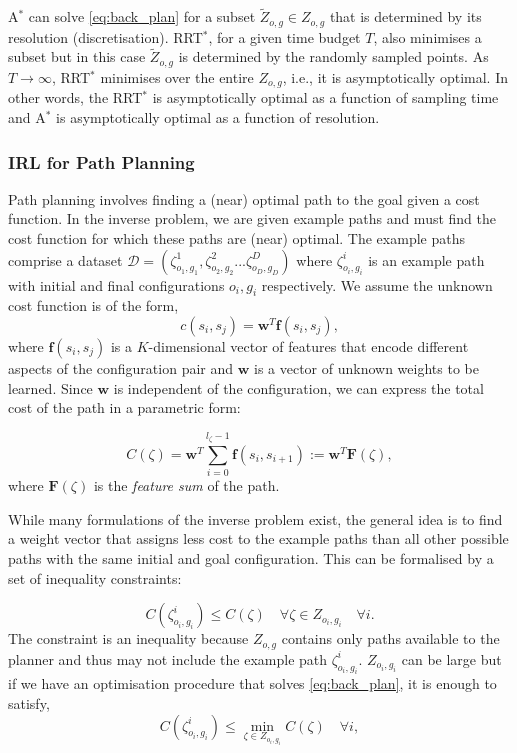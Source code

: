 \documentclass[a4paper,11pt]{report}
\begin{document}
A$^*$ can solve \eqref{eq:back_plan} for a subset $\tilde{Z}_{o,g} \in  Z_{o,g}$ that is determined by its resolution (discretisation). RRT$^*$, for a given time budget $T$, also minimises a subset but in this case $\tilde{Z}_{o,g}$ is determined by the randomly sampled points. As $T \rightarrow \infty$, RRT$^*$ minimises over the entire $Z_{o,g}$, i.e., it is asymptotically optimal. In other words, the RRT$^*$ is asymptotically optimal as a function of sampling time and A$^*$ is asymptotically optimal as a function of resolution. %

\subsubsection{IRL for Path Planning \label{subsec:inverse_problem}}
Path planning involves finding a (near) optimal path to the goal given a cost function. In the inverse problem, we are given example paths and must find the cost function for which these paths are (near) optimal.  The example paths comprise a dataset $\mathcal{D} = (\zeta^1_{o_1,g_1},\zeta^2_{o_2,g_2}...\zeta^D_{o_D,g_D})$ where $\zeta^i_{o_i,g_i}$ is an example path with initial and final configurations $o_i,g_i$ respectively. We assume the unknown cost function is of the form,
\begin{equation}
	c(s_i,s_j) = \mathbf{w}^T \mathbf{f}(s_i,s_j), \label{eq:inner_prod}
\end{equation}
where $\mathbf{f}(s_i,s_j)$ is a $K$-dimensional vector of features that encode different aspects of the configuration pair and $\mathbf{w}$ is a vector of unknown weights to be learned. Since $\mathbf{w}$ is independent of the configuration, we can express the total cost of the path in a parametric form:

\begin{equation}
	C(\zeta) = \mathbf{w}^T\sum_{i=0}^{l_{\zeta}-1} \mathbf{f}(s_i,s_{i+1}) := \mathbf{w}^T \mathbf{F}(\zeta),
\end{equation}
where $\mathbf{F}(\zeta)$ is the \emph{feature sum} of the path.

While many formulations of the inverse problem exist, the general idea is to find a weight vector that assigns less cost to the example paths than all other possible paths with the same initial and goal configuration.  This can be formalised by a set of inequality constraints:

\begin{equation}
	C(\zeta^i_{o_i,g_i}) \leq  C(\zeta) \quad \forall \zeta \in Z_{o_i,g_i}  \quad \forall i. \label{eq:const1}
\end{equation}
The constraint is an inequality because $Z_{o,g}$ contains only paths available to the planner and thus may not include the example path $\zeta^i_{o_i,g_i}$.
$Z_{o_i,g_i}$ can be large but if we have an optimisation procedure that solves \eqref{eq:back_plan}, it is enough to satisfy, 
\begin{equation}
	C(\zeta^i_{o_i,g_i}) \leq \min_{\zeta \in Z_{o_i,g_i}} C(\zeta) \quad \forall i, \label{eq:const}
\end{equation}
\end{document}
